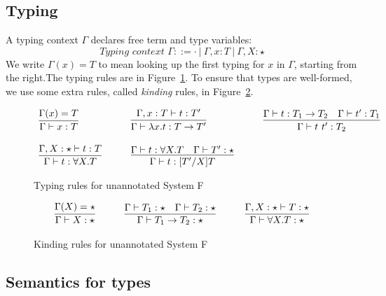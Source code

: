 \documentclass{article}
\begin{document}
\subsection{Typing}

A typing context $\Gamma$ declares free term and type variables:
\[
\textit{Typing context }\Gamma ::= \cdot\ |\ \Gamma, x:T\ |\ \Gamma, X : \star
\]
We write $\Gamma(x) = T$ to mean looking up the first typing for $x$ in $\Gamma$,
starting from the right.The typing rules are in
Figure~\ref{fig:tp}.  To ensure that types are well-formed, we
use some extra rules, called \emph{kinding} rules, in Figure~\ref{fig:knd}.  

\begin{figure}
\[
\begin{array}{lllll}
\infer{\Gamma \vdash x : T}{\Gamma(x) = T} &\ \ \ &
\infer{\Gamma \vdash \lambda x . t : T \to T'}{\Gamma, x : T \vdash t : T'} &\ \ \ &
\infer{\Gamma \vdash t\ t' : T_2}{\Gamma \vdash t : T_1 \to T_2 & \Gamma \vdash t' : T_1} \\ \\
\infer{\Gamma \vdash t : \forall X.T}{\Gamma,X : \star \vdash t : T} &\ \ \ &
\infer{\Gamma \vdash t : [T'/X]T}{\Gamma \vdash t : \forall X.T & \Gamma \vdash T' : \star} &\ \ \ &\ 
\end{array}
\]
\caption{Typing rules for unannotated System F}
\label{fig:tp}
\end{figure}

\begin{figure}
\[
\begin{array}{lllll}
\infer{\Gamma \vdash X : \star}{\Gamma(X) = \star} &\ \ \ &
\infer{\Gamma \vdash T_1 \to T_2 : \star}{\Gamma \vdash T_1 : \star & \Gamma \vdash T_2 : \star} &\ \ \ &
\infer{\Gamma \vdash \forall X.T : \star}{\Gamma,X : \star \vdash T : \star}
\end{array}
\]
\caption{Kinding rules for unannotated System F}
\label{fig:knd}
\end{figure}

\subsection{Semantics for types}
\end{document}
